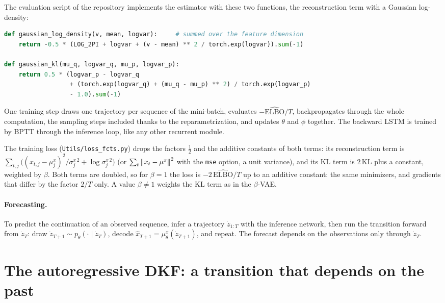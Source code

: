 \begin{notechapter}
The evaluation script of the repository implements the estimator with these two
functions, the reconstruction term with a Gaussian log-density:
\begin{lstlisting}[language=Python]
def gaussian_log_density(v, mean, logvar):     # summed over the feature dimension
    return -0.5 * (LOG_2PI + logvar + (v - mean) ** 2 / torch.exp(logvar)).sum(-1)

def gaussian_kl(mu_q, logvar_q, mu_p, logvar_p):
    return 0.5 * (logvar_p - logvar_q
                  + (torch.exp(logvar_q) + (mu_q - mu_p) ** 2) / torch.exp(logvar_p)
                  - 1.0).sum(-1)
\end{lstlisting}
One training step draws one trajectory per sequence of the mini-batch, evaluates
$-\widehat{\mathrm{ELBO}}/T$, backpropagates through the whole computation, the sampling steps included
thanks to the reparametrization, and updates $\theta$ and $\phi$ together. The backward LSTM is trained by
BPTT through the inference loop, like any other recurrent module.

\begin{remark}
The training loss (\texttt{Utils/loss\_fcts.py}) drops the factors $\tfrac12$ and the additive constants of
both terms: its reconstruction term is $\sum_{t,j}\bigl((x_{t,j} - \mu^x_j)^2/\sigma^{x\,2}_j + \log\sigma^{x\,2}_j\bigr)$ (or $\sum_t\left\|x_t - \mu^x\right\|^2$ with the
\texttt{mse} option, a unit variance), and its KL term is $2\,\mathrm{KL}$ plus a constant, weighted by $\beta$. Both terms are
doubled, so for $\beta = 1$ the loss is $-2\,\widehat{\mathrm{ELBO}}/T$ up to an additive constant: the same minimizers, and
gradients that differ by the factor $2/T$ only. A value $\beta\neq1$ weights the KL term as in the $\beta$-VAE.
\end{remark}

\paragraph{Forecasting.} To predict the continuation of an observed sequence, infer a trajectory
$\dot z_{1:T}$ with the inference network, then run the transition forward from $\dot z_T$: draw $\dot z_{T+1}\sim p_\theta(\cdot\mid\dot z_T)$,
decode $\hat x_{T+1} = \mu^x_\theta(\dot z_{T+1})$, and repeat. The forecast depends on the observations only through $\dot z_T$.

\section{The autoregressive DKF: a transition that depends on the past}\label{dkf:sec:ar}


\end{notechapter}
